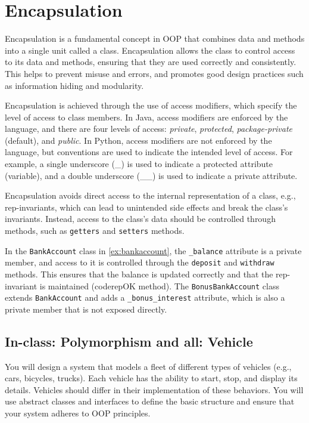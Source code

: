 \documentclass[oneside,11pt,dvipsnames]{book}
\newcommand{\code}[1]{\texttt{#1}}
\begin{document}
\section{Encapsulation}
Encapsulation is a fundamental concept in OOP that combines data and methods into a single unit called a class. Encapsulation allows the class to control access to its data and methods, ensuring that they are used correctly and consistently. This helps to prevent misuse and errors, and promotes good design practices such as information hiding and modularity.

Encapsulation is achieved through the use of access modifiers, which specify the level of access to class members. In Java, access modifiers are enforced by the language, and there are four levels of access: \emph{private}, \emph{protected}, \emph{package-private} (default), and \emph{public}.  In Python, access modifiers are not enforced by the language, but conventions are used to indicate the intended level of access. For example, a single underscore (\_) is used to indicate a protected attribute (variable), and a double underscore (\_\_) is used to indicate a private attribute. 

Encapsulation avoids direct access to the internal representation of a class, e.g., rep-invariants, which can lead to unintended side effects and break the class's invariants. Instead, access to the class's data should be controlled through methods, such as \code{getters} and \code{setters} methods.

In the \code{BankAccount} class in \autoref{ex:bankaccount}, the \code{\_balance} attribute is a private member, and access to it is controlled through the \code{deposit} and \code{withdraw} methods. This ensures that the balance is updated correctly and that the rep-invariant is maintained (code{repOK} method). The \code{BonusBankAccount} class extends \code{BankAccount} and adds a \code{\_bonus\_interest} attribute, which is also a private member that is not exposed directly. 



\subsection{In-class: Polymorphism and all: Vehicle}

You will design a system that models a fleet of different types of vehicles (e.g., cars, bicycles, trucks). Each vehicle has the ability to start, stop, and display its details. Vehicles should differ in their implementation of these behaviors. You will use abstract classes and interfaces to define the basic structure and ensure that your system adheres to OOP principles.
\end{document}
